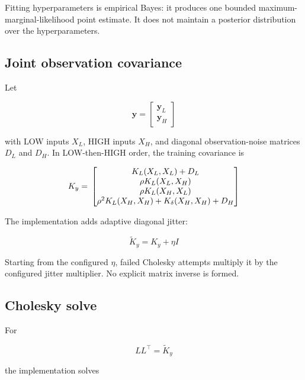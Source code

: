 \documentclass[11pt]{article}
\begin{document}
Fitting hyperparameters is empirical Bayes: it produces one bounded maximum-marginal-likelihood point estimate. It does not maintain a posterior distribution over the hyperparameters.


\subsection{Joint observation covariance}


Let


\begin{equation}
\mathbf y
=
\begin{bmatrix}
\mathbf y_L\\
\mathbf y_H
\end{bmatrix}
\end{equation}


with LOW inputs $X_L$, HIGH inputs $X_H$, and diagonal observation-noise matrices $D_L$ and $D_H$. In LOW-then-HIGH order, the training covariance is


\begin{equation}
K_y \\
= \\
\begin{bmatrix}
K_L(X_L,X_L)+D_L \\
\rho K_L(X_L,X_H) \\
\rho K_L(X_H,X_L) \\
\rho^2 K_L(X_H,X_H)+K_\delta(X_H,X_H)+D_H \\
\end{bmatrix}
\end{equation}


The implementation adds adaptive diagonal jitter:


\begin{equation}
\widetilde K_y=K_y+\eta I
\end{equation}


Starting from the configured $\eta$, failed Cholesky attempts multiply it by the configured jitter multiplier. No explicit matrix inverse is formed.


\subsection{Cholesky solve}


For


\begin{equation}
LL^\top=\widetilde K_y
\end{equation}


the implementation solves
\end{document}
